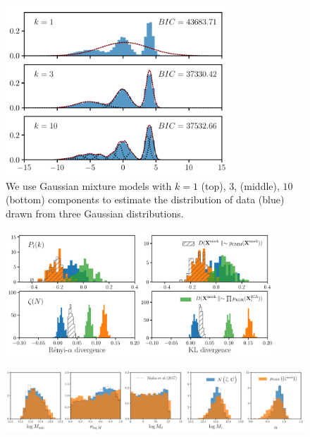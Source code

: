 \documentclass[12pt, letterpaper, preprint]{aastex}
\begin{document}
\begin{figure}
\begin{center}
\includegraphics[width=0.75\textwidth]{figs/GMM_pedagog.pdf}
\caption{We use Gaussian mixture models with $k = 1$ (top), $3$, (middle), $10$ (bottom) 
    components to estimate the distribution of data (blue) drawn from three Gaussian distributions.
}
\label{fig:gmf_ped}
\end{center}
\end{figure}

\begin{figure}
\begin{center}
\includegraphics[width=0.9\textwidth]{figs/kNNdiverg_nonGauss.pdf}
\caption{}
\label{fig:div_nongauss}
\end{center}
\end{figure}

\begin{figure}
\begin{center}
\includegraphics[width=\textwidth]{figs/Like_GMF_comparison.pdf}
\caption{}
\label{fig:gmf_like}
\end{center}
\end{figure}
\end{document}
